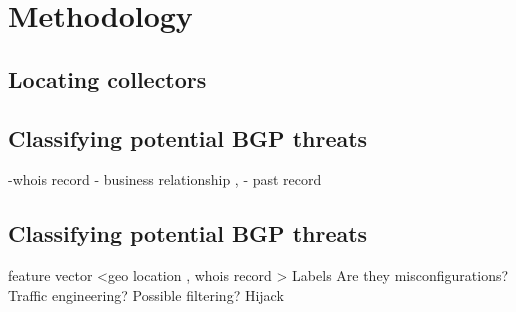  \section{Methodology}\label{sec:methodology}
\subsection{Locating collectors }
\subsection{Classifying potential BGP threats}
-whois record
- business relationship ,
- past record
\subsection{Classifying potential BGP threats}
feature vector <geo location , whois record >
Labels Are they misconfigurations? Traffic engineering? Possible filtering?  Hijack